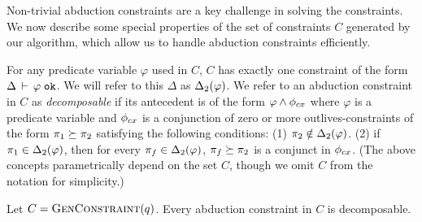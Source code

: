 Non-trivial abduction constraints are a key challenge in solving the constraints.
We now describe some special properties of the set of constraints $C$
generated by our algorithm, which allow us to handle abduction constraints efficiently.

For any predicate variable $\varphi$ used in $C$, $C$ has exactly one constraint
of the form $\Delta\,\vdash\,\varphi \; \texttt{ok}$. We will refer to this $\Delta$ as
${\Delta_2}(\varphi)$.
%
%
We refer to an abduction constraint in $C$ as \emph{decomposable}
if its antecedent is of the form $\varphi \wedge \phi_{cx}$ where $\varphi$ is a predicate variable and
$\phi_{cx}$ is a conjunction of zero or more outlives-constraints of the form
$\pi_1 \succeq \pi_2$ satisfying the following conditions:
(1) $\pi_2 \notin {\Delta_2}(\varphi)$.
(2) if $\pi_1 \in {\Delta_2}(\varphi)$, then for
every $\pi_f \in {\Delta_2}(\varphi)$, $\pi_f \succeq \pi_2$ is
a conjunct in $\phi_{cx}$.
%
(The above concepts parametrically depend on the set $C$, though we omit $C$
from the notation for simplicity.)

\begin{lemma}
  \label{lemma:gc-is-decomposable}
  Let $C = \textsc{GenConstraint}(q)$. Every abduction constraint in $C$ is decomposable.
\end{lemma}


